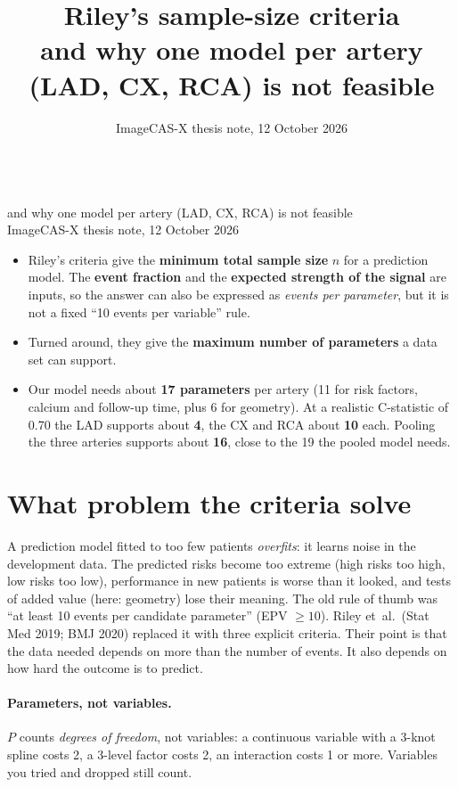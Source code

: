 \documentclass[11pt,a4paper]{article}
\title{Riley's sample-size criteria\\[2pt]\large and why one model per artery (LAD, CX, RCA) is not feasible}
\author{}
\date{ImageCAS-X thesis note, 12 October 2026}
\begin{document}
{\\[4pt]{\large and why one model per artery (LAD, CX, RCA) is not feasible}\\[6pt]{\small ImageCAS-X thesis note, 12 October 2026}\par}\vspace{10pt}

\begin{keybox}
\begin{itemize}\setlength\itemsep{2pt}
  \item Riley's criteria give the \textbf{minimum total sample size} $n$ for a prediction model. The
        \textbf{event fraction} and the \textbf{expected strength of the signal} are inputs, so the
        answer can also be expressed as \emph{events per parameter}, but it is not a fixed
        ``10 events per variable'' rule.
  \item Turned around, they give the \textbf{maximum number of parameters} a data set can support.
  \item Our model needs about \textbf{17 parameters} per artery (11 for risk factors, calcium and
        follow-up time, plus 6 for geometry). At a realistic C-statistic of 0.70 the LAD supports
        about \textbf{4}, the CX and RCA about \textbf{10} each. Pooling the three arteries supports
        about \textbf{16}, close to the 19 the pooled model needs.
\end{itemize}
\end{keybox}

\section{What problem the criteria solve}

A prediction model fitted to too few patients \emph{overfits}: it learns noise in the development
data. The predicted risks become too extreme (high risks too high, low risks too low), performance
in new patients is worse than it looked, and tests of added value (here: geometry) lose their
meaning. The old rule of thumb was ``at least 10 events per candidate parameter'' (EPV $\geq 10$).
Riley et~al.\ (Stat Med 2019; BMJ 2020) replaced it with three explicit criteria. Their point is that
the data needed depends on more than the number of events. It also depends on how hard the outcome
is to predict.

\paragraph{Parameters, not variables.} $P$ counts \emph{degrees of freedom}, not variables: a
continuous variable with a 3-knot spline costs 2, a 3-level factor costs 2, an interaction costs 1
or more. Variables you tried and dropped still count.
\end{document}
